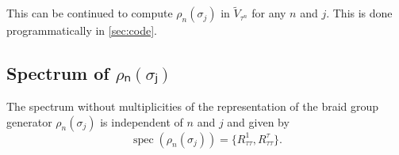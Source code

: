 This can be continued to compute $ρ_n(σ_j)$ in $\widetilde{V}_{τ^n}$ for any $n$ and $j$. This is done programmatically in \cref{sec:code}.










\subsection{Spectrum of \texorpdfstring{$ρₙ(σⱼ)$}{ρₙ(σⱼ)}}

\begin{theorem}
  The spectrum without multiplicities of the representation of the braid group generator $ρ_n(σ_j)$ is independent of $n$ and $j$ and given by
  \begin{equation}
    \operatorname{spec}(ρ_n(σ_j)) = \big\{ R_{\tau\tau}^1, R_{\tau\tau}^\tau \big\}.
  \end{equation}
\end{theorem}


